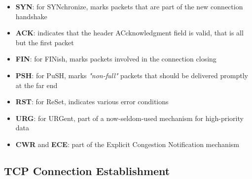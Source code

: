 \documentclass[11pt]{article}
\providecommand{\tightlist}{%
      \setlength{\itemsep}{0pt}\setlength{\parskip}{0pt}}
\begin{document}
\begin{itemize}
\begin{itemize}
    \begin{itemize}
    \tightlist
    \item
      \textbf{SYN}: for SYNchronize, marks packets that are part of the
      new connection handshake
    \item
      \textbf{ACK}: indicates that the header ACcknowledgment field is
      valid, that is all but the first packet
    \item
      \textbf{FIN}: for FINish, marks packets involved in the connection
      closing
    \item
      \textbf{PSH}: for PuSH, marks \emph{"non-full"} packets that
      should be delivered promptly at the far end
    \item
      \textbf{RST}: for ReSet, indicates various error conditions
    \item
      \textbf{URG}: for URGent, part of a now-seldom-used mechanism for
      high-priority data
    \item
      \textbf{CWR} and \textbf{ECE}: part of the Explicit Congestion
      Notification mechanism
    \end{itemize}
  \end{itemize}
\end{itemize}

    \subsection{TCP Connection
Establishment}\label{tcp-connection-establishment}
\end{document}
